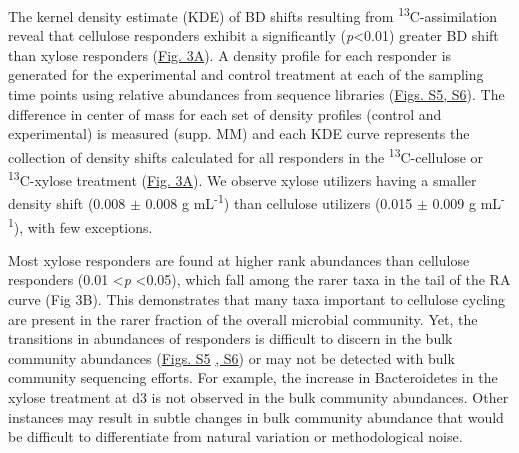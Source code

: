 The kernel density estimate (KDE) of BD shifts resulting from
\textsuperscript{13}C-assimilation reveal that cellulose responders exhibit a
significantly (\textit{p}\textless 0.01) greater BD shift than xylose
responders
(\href{https://authorea.com/users/3537/articles/3612/master/file/figures/shift_and_rabund2/shift_and_rabund2.png}{Fig.
3A}). A density profile for each responder is generated for the experimental
and control treatment at each of the sampling time points using relative
abundances from sequence libraries
(\href{https://authorea.com/users/3537/articles/8459/master/file/figures/xylose_resp_profiles/xylose_resp_profiles.png}{Figs.
S5}\href{https://authorea.com/users/3537/articles/8459/master/file/figures/cellulose_resp_profiles/cellulose_resp_profiles.png}{,
S6}). The difference in center of mass for each set of density profiles
(control and experimental) is measured (supp. MM) and each KDE curve represents
the collection of density shifts calculated for all responders in the
\textsuperscript{13}C-cellulose or \textsuperscript{13}C-xylose treatment
(\href{https://authorea.com/users/3537/articles/3612/master/file/figures/shift_and_rabund2/shift_and_rabund2.png}{Fig.
3A}). We observe xylose utilizers having a smaller density shift (0.008 $\pm$
0.008 g mL\textsuperscript{-1}) than cellulose utilizers (0.015 $\pm$ 0.009 g
mL\textsuperscript{-1}), with few exceptions. 

Most xylose responders are found at higher rank abundances than cellulose
responders (0.01 \textless \textit{p} \textless 0.05), which fall among the
rarer taxa in the tail of the RA curve (Fig 3B). This demonstrates that many
taxa important to cellulose cycling are present in the rarer fraction of the
overall microbial community. Yet, the transitions in abundances of responders
is difficult to discern in the bulk community abundances
(\href{https://authorea.com/users/3537/articles/8459/master/file/figures/xylose_resp_profiles/xylose_resp_profiles.png}{Figs.
S5}
\href{https://authorea.com/users/3537/articles/8459/master/file/figures/cellulose_resp_profiles/cellulose_resp_profiles.png}{,
S6}) or may not be detected with bulk community sequencing efforts. For
example, the increase in Bacteroidetes in the xylose treatment at d3 is not
observed in the bulk community abundances. Other instances may result in subtle
changes in bulk community abundance that would be difficult to differentiate
from natural variation or methodological noise.


